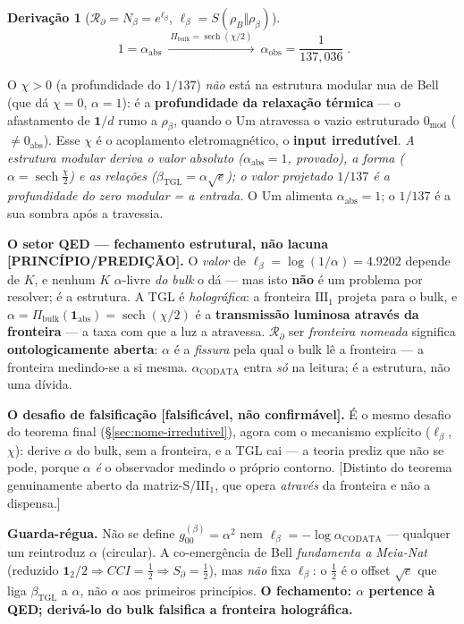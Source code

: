 \documentclass[11pt]{article}
\newcommand{\bTGL}{\beta_{\mathrm{TGL}}}\newcommand{\Msun}{M_{\odot}}\newcommand{\TGL}{\mathrm{TGL}}
\theoremstyle{definition}\newtheorem{deriv}{Derivação}
\begin{document}
\begin{deriv}[$\mathcal{R}_\partial=N_\beta=e^{\ell_\beta}$, $\ell_\beta=S(\rho_B\Vert\rho_\beta)$]
\begin{equation}\boxed{\;1=\alpha_{\mathrm{abs}}\ \xrightarrow{\ \Pi_{\mathrm{bulk}}=\operatorname{sech}(\chi/2)\ }\ \alpha_{\mathrm{obs}}=\frac{1}{137{,}036}\;}.\end{equation}

O $\chi>0$ (a profundidade do $1/137$) \emph{não} está na estrutura modular nua de Bell (que dá $\chi=0$, $\alpha=1$): é a \textbf{profundidade da relaxação térmica} --- o afastamento de $\mathbf 1/d$ rumo a $\rho_\beta$, quando o Um atravessa o vazio estruturado $0_{\mathrm{mod}}$ ($\neq 0_{\mathrm{abs}}$). Esse $\chi$ é o acoplamento eletromagnético, o \textbf{input irredutível}. \emph{A estrutura modular deriva o valor absoluto ($\alpha_{\mathrm{abs}}=1$, provado), a forma ($\alpha=\operatorname{sech}\tfrac\chi2$) e as relações ($\bTGL=\alpha\sqrt e$); o valor projetado $1/137$ é a profundidade do zero modular = a entrada.} O Um alimenta $\alpha_{\mathrm{abs}}=1$; o $1/137$ é a sua sombra após a travessia.

\textbf{O setor QED --- fechamento estrutural, não lacuna \textsf{[PRINCÍPIO/PREDIÇÃO]}.} O \emph{valor} de $\ell_\beta=\log(1/\alpha)=4.9202$ depende de $K$, e nenhum $K$ $\alpha$-livre \emph{do bulk} o dá --- mas isto \textbf{não} é um problema por resolver; é a estrutura. A TGL é \emph{holográfica}: a fronteira $\mathrm{III}_1$ projeta para o bulk, e $\alpha=\Pi_{\mathrm{bulk}}(\mathbf 1_{\mathrm{abs}})=\operatorname{sech}(\chi/2)$ é a \textbf{transmissão luminosa através da fronteira} --- a taxa com que a luz a atravessa. $\mathcal{R}_\partial$ ser \emph{fronteira nomeada} significa \textbf{ontologicamente aberta}: $\alpha$ é a \emph{fissura} pela qual o bulk lê a fronteira --- a fronteira medindo-se a si mesma. $\alpha_{\mathrm{CODATA}}$ entra \emph{só} na leitura; é a estrutura, não uma dívida.

\textbf{O desafio de falsificação \textsf{[falsificável, não confirmável]}.} É o mesmo desafio do teorema final (\S\ref{sec:nome-irredutivel}), agora com o mecanismo explícito ($\ell_\beta$, $\chi$): derive $\alpha$ do bulk, sem a fronteira, e a TGL cai --- a teoria prediz que não se pode, porque $\alpha$ \emph{é} o observador medindo o próprio contorno. \textsf{[Distinto do teorema genuinamente aberto da matriz-S/$\mathrm{III}_1$, que opera \emph{através} da fronteira e não a dispensa.]}

\textbf{Guarda-régua.} Não se define $g_{00}^{(\beta)}=\alpha^2$ nem $\ell_\beta=-\log\alpha_{\mathrm{CODATA}}$ --- qualquer um reintroduz $\alpha$ (circular). A co-emergência de Bell \emph{fundamenta a Meia-Nat} (reduzido $\mathbf 1_2/2\Rightarrow CCI=\tfrac12\Rightarrow S_\partial=\tfrac12$), mas \emph{não} fixa $\ell_\beta$: o $\tfrac12$ é o offset $\sqrt e$ que liga $\bTGL$ a $\alpha$, não $\alpha$ aos primeiros princípios. \textbf{O fechamento: $\alpha$ pertence à QED; derivá-lo do bulk falsifica a fronteira holográfica.}\end{deriv}
\end{document}
